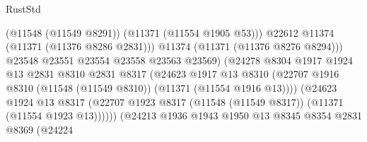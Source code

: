 \begin{lexlean}{RustStd}
\begin{coremodule}
                                                (@11548 (@11549 @8291))
                                                (@11371 (@11554 @1905 @53)))
                                              @22612
                                              @11374
                                              (@11371 (@11376 @8286 @2831)))
                                            @11374
                                            (@11371 (@11376 @8276 @8294)))
                                          @23548
                                          @23551
                                          @23554
                                          @23558
                                          @23563
                                          @23569)
                                        (@24278
                                          @8304
                                          @1917
                                          @1924
                                          @13
                                          @2831
                                          @8310
                                          @2831
                                          @8317
                                          (@24623
                                            @1917
                                            @13
                                            @8310
                                            (@22707
                                              @1916
                                              @8310
                                              (@11548 (@11549 @8310))
                                              (@11371 (@11554 @1916 @13))))
                                          (@24623
                                            @1924
                                            @13
                                            @8317
                                            (@22707
                                              @1923
                                              @8317
                                              (@11548 (@11549 @8317))
                                              (@11371 (@11554 @1923 @13))))))
                                      (@24213
                                        @1936
                                        @1943
                                        @1950
                                        @13
                                        @8345
                                        @8354
                                        @2831
                                        @8369
                                        (@24224

\end{coremodule}
\end{lexlean}
